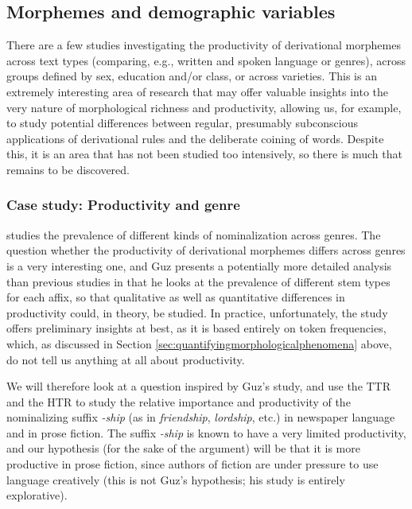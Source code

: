 \subsection{Morphemes and demographic variables}
\label{sec:morphemesanddemographicvariables}

There are a few studies investigating the productivity of derivational morphemes across text types (comparing, e.g., written and spoken language or genres), across groups defined by sex, education and/or class, or across varieties. This is an extremely interesting area of research that may offer valuable insights into the very nature of morphological richness and productivity, allowing us, for example, to study potential differences between regular, presumably subconscious applications of derivational rules and the deliberate coining of words. Despite this, it is an area that has not been studied too intensively, so there is much that remains to be discovered.

\subsubsection{Case study: Productivity and genre}
\label{sec:productivityandgenre}

\citet{guz_english_2009} studies the prevalence of different kinds of nominalization across genres. The question whether the productivity of derivational morphemes differs across genres is a very interesting one, and Guz presents a potentially more detailed analysis than previous studies in that he looks at the prevalence of different stem types for each affix, so that qualitative as well as quantitative differences in productivity could, in theory, be studied. In practice, unfortunately, the study offers preliminary insights at best, as it is based entirely on token frequencies, which, as discussed in Section \ref{sec:quantifyingmorphologicalphenomena} above, do not tell us anything at all about productivity.

We will therefore look at a question inspired by Guz's study, and use the TTR and the HTR to study the relative importance and productivity of the nominalizing suffix \textit{-ship} (as in \textit{friendship}, \textit{lordship}, etc.) in newspaper language and in prose fiction. The suffix \textit{-ship} is known to have a very limited productivity, and our hypothesis (for the sake of the argument) will be that it is more productive in prose fiction, since authors of fiction are under pressure to use language creatively (this is not Guz's hypothesis; his study is entirely explorative).

